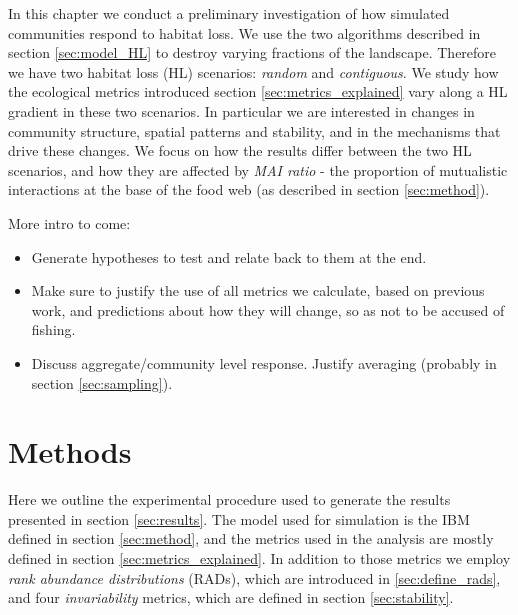In this chapter we conduct a preliminary investigation of how simulated communities respond to habitat loss. We use the two algorithms described in section \ref{sec:model_HL} to destroy varying fractions of the landscape. Therefore we have two habitat loss (HL) scenarios: \emph{random} and \emph{contiguous}. We study how the ecological metrics introduced section \ref{sec:metrics_explained} vary along a HL gradient in these two scenarios. In particular we are interested in changes in community structure, spatial patterns and stability, and in the mechanisms that drive these changes. We focus on how the results differ between the two HL scenarios, and how they are affected by \emph{MAI ratio} - the proportion of mutualistic interactions at the base of the food web (as described in section \ref{sec:method}). 




More intro to come:

\begin{itemize}
	\item Generate hypotheses to test and relate back to them at the end. 
	
	\item Make sure to justify the use of all metrics we calculate, based on previous work, and predictions about how they will change, so as not to be accused of fishing. 

	\item Discuss aggregate/community level response. Justify averaging (probably in section \ref{sec:sampling}).
\end{itemize}





\section{Methods}
\label{sec:methods}

Here we outline the experimental procedure used to generate the results presented in section \ref{sec:results}. The model used for simulation is the IBM defined in section \ref{sec:method}, and the metrics used in the analysis are mostly defined in section \ref{sec:metrics_explained}. In addition to those metrics we employ \emph{rank abundance distributions} (RADs), which are introduced in \ref{sec:define_rads}, and four \emph{invariability} metrics, which are defined in section \ref{sec:stability}.

